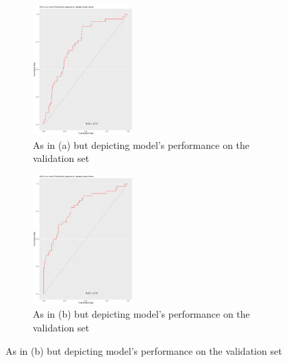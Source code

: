 \documentclass{DissertateUSU}
\begin{document}
\begin{figure}[t!]
\medskip
\begin{subfigure}{0.48\textwidth}
\includegraphics[width=\linewidth, height=5cm]{POI_ROC_Validation.pdf}
\caption{As in (a) but depicting model's performance on the validation set} \label{POI_ROC_Validate}
\end{subfigure}\hspace*{\fill}
\begin{subfigure}{0.48\textwidth}
\includegraphics[width=\linewidth, height=5cm]{BIN_ROC_Validation.pdf}
\caption{As in (b) but depicting model's performance on the validation set} \label{BIN_ROC_Validate}
\end{subfigure}


\end{figure}
\end{document}
